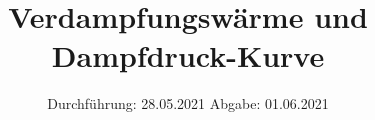 

\subject{V203}
\title{Verdampfungswärme und Dampfdruck-Kurve}
\date{%
  Durchführung: 28.05.2021
  \hspace{3em}
  Abgabe: 01.06.2021
}



\maketitle
\thispagestyle{empty}
\tableofcontents
\newpage






\printbibliography{}


